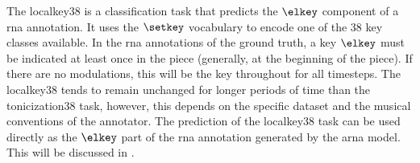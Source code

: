 
The \gls{localkey38} is a classification task that predicts
the $\elkey$ component of a \gls{rna} annotation. It uses
the $\setkey$ vocabulary to encode one of the 38 key classes
available. In the \gls{rna} annotations of the ground truth,
a key $\elkey$ must be indicated at least once in the piece
(generally, at the beginning of the piece). If there are no
modulations, this will be the key throughout for all
timesteps. The \gls{localkey38} tends to remain unchanged for
longer periods of time than the \gls{tonicization38} task,
however, this depends on the specific dataset and the
musical conventions of the annotator. The prediction of the
\gls{localkey38} task can be used directly as the $\elkey$
part of the \gls{rna} annotation generated by the \gls{arna}
model. This will be discussed in .


